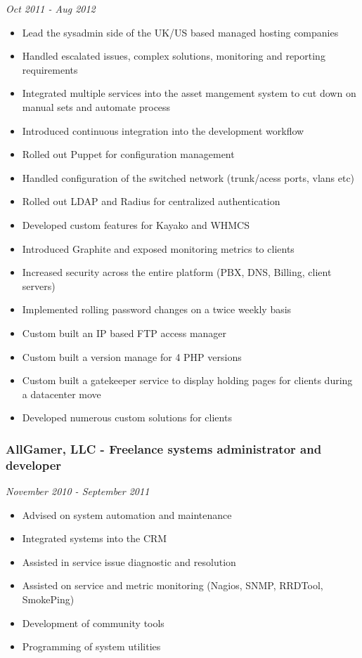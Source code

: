 \emph{Oct 2011 - Aug 2012}

\begin{itemize}
\item
  Lead the sysadmin side of the UK/US based managed hosting companies
\item
  Handled escalated issues, complex solutions, monitoring and reporting
  requirements
\item
  Integrated multiple services into the asset mangement system to cut
  down on manual sets and automate process
\item
  Introduced continuous integration into the development workflow
\item
  Rolled out Puppet for configuration management
\item
  Handled configuration of the switched network (trunk/acess ports,
  vlans etc)
\item
  Rolled out LDAP and Radius for centralized authentication
\item
  Developed custom features for Kayako and WHMCS
\item
  Introduced Graphite and exposed monitoring metrics to clients
\item
  Increased security across the entire platform (PBX, DNS, Billing,
  client servers)
\item
  Implemented rolling password changes on a twice weekly basis
\item
  Custom built an IP based FTP access manager
\item
  Custom built a version manage for 4 PHP versions
\item
  Custom built a gatekeeper service to display holding pages for clients
  during a datacenter move
\item
  Developed numerous custom solutions for clients
\end{itemize}
\subsubsection{AllGamer, LLC - Freelance systems administrator and
developer}

\emph{November 2010 - September 2011}

\begin{itemize}
\item
  Advised on system automation and maintenance
\item
  Integrated systems into the CRM
\item
  Assisted in service issue diagnostic and resolution
\item
  Assisted on service and metric monitoring (Nagios, SNMP, RRDTool,
  SmokePing)
\item
  Development of community tools
\item
  Programming of system utilities
\end{itemize}

